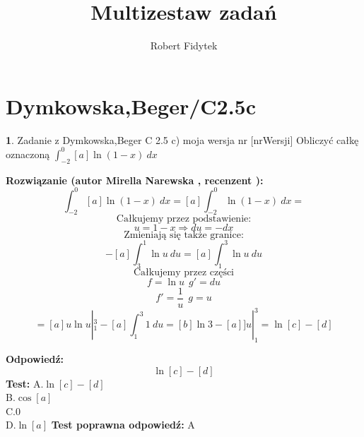 \documentclass[12pt, a4paper]{article}
\title{Multizestaw zadań}
\author{Robert Fidytek}
\date{}
\theoremstyle{definition} %
\newtheorem{zad}{}
\newcommand{\kategoria}[1]{\section{#1}} %
\newcommand{\zadStart}[1]{\begin{zad}#1\newline} %
\newcommand{\zadStop}{\end{zad}}   %
\newcommand{\rozwStart}[2]{\noindent \textbf{Rozwiązanie (autor #1 , recenzent #2): }\newline} %
\newcommand{\odpStart}{\noindent \textbf{Odpowiedź:}\newline}    %
\newcommand{\odpStop}{\newline}                                             %
\newcommand{\testStart}{\noindent \textbf{Test:}\newline} %
\newcommand{\testStop}{\newline} %
\newcommand{\kluczStart}{\noindent \textbf{Test poprawna odpowiedź:}\newline} %
\newcommand{\kluczStop}{\newline} %
\begin{document}
\maketitle



\kategoria{Dymkowska,Beger/C2.5c}
\zadStart{Zadanie z Dymkowska,Beger C 2.5 c) moja wersja nr [nrWersji]}
Obliczyć całkę oznaczoną $\displaystyle \int_{-2}^{0} [a]\ln{(1-x)} \ dx $
\zadStop
\rozwStart{Mirella Narewska}{}
$$ \int_{-2}^{0} [a]\ln{(1-x)} \ dx  = [a]  \int_{-2}^{0} \ln{(1-x)} \ dx = $$
$$\text{Całkujemy przez podstawienie:}$$
$$u=1-x \Rightarrow du=-dx$$
$$\text{Zmieniają się także granice:}$$
$$-[a]\int_{3}^{1} \ln{u} \ du= [a]\int_{1}^{3} \ln{u} \ du$$
$$\text{Całkujemy przez części}$$
$$f=\ln{u} \ \ g'=du$$
$$f'=\frac{1}{u} \ \ g=u$$
$$=[a]u\ln{u}|_{1}^{3} -[a]\int_{1}^{3} 1 \ du= [b]\ln{3} -[a]]u|_{1}^{3}=\ln{[c]} -[d]$$

\odpStart
$$\ln{[c]} -[d]$$
\odpStop
\testStart
A.$\ln{[c]} -[d]$
\\
B.$\cos{[a]}$
\\
C.$0$
\\
D.$\ln{[a]}$
\testStop
\kluczStart
A
\kluczStop
\end{document}
